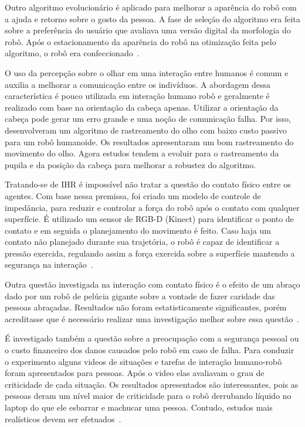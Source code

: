 Outro algoritmo evolucionário é aplicado para melhorar a aparência do robô com a ajuda e retorno sobre o gosto da pessoa. A fase de seleção do algoritmo era feita sobre a preferência do usuário que avaliava uma versão digital da morfologia do robô. Após o estacionamento da aparência do robô na otimização feita pelo algoritmo, o robô era confeccionado~\cite{debeir:2016}.

O uso da percepção sobre o olhar em uma interação entre humanos é comum e auxilia a melhorar a comunicação entre os indivíduos. A abordagem dessa característica é pouco utilizada em interação humano robô e geralmente é realizado com base na orientação da cabeça apenas. Utilizar a orientação da cabeça pode gerar um erro grande e uma noção de comunicação falha. Por isso,  desenvolveram um algoritmo de rastreamento do olho com baixo custo passivo para um robô humanoide. Os resultados apresentaram um bom rastreamento do movimento do olho. Agora estudos tendem a evoluir para o rastreamento da pupila e da posição da cabeça para melhorar a robustez do algoritmo.

Tratando-se de IHR é impossível não tratar a questão do contato físico entre os agentes. Com base nessa premissa, foi criado um modelo de controle de impedância, para reduzir e controlar a força do robô após o contato com qualquer superfície. É utilizado um sensor de RGB-D (Kinect) para identificar o ponto de contato e em seguida o planejamento do movimento é feito. Caso haja um contato não planejado durante sua trajetória, o robô é capaz de identificar a pressão exercida, regulando assim a força exercida sobre a superfície mantendo a segurança na interação~\cite{magrini:2015}.

Outra questão investigada na interação com contato físico é o efeito de um abraço dado por um robô de pelúcia gigante sobre a vontade de fazer caridade das pessoas abraçadas. Resultados não foram estatisticamente significantes, porém acreditasse que é necessário realizar uma investigação melhor sobre essa questão~\cite{nakata:2017}.

É investigado também a questão sobre a preocupação com a segurança pessoal ou o custo financeiro dos danos causados pelo robô em caso de falha. Para conduzir o experimento alguns videos de situações e tarefas de interação humano-robô foram apresentados para pessoas. Após o video elas avaliavam o grau de criticidade de cada situação.
Os resultados apresentados são interessantes, pois as pessoas deram um nível maior de criticidade para o robô derrubando líquido no laptop do que ele esbarrar e machucar uma pessoa. Contudo, estudos mais realísticos devem ser efetuados~\cite{adubor:2017}.


